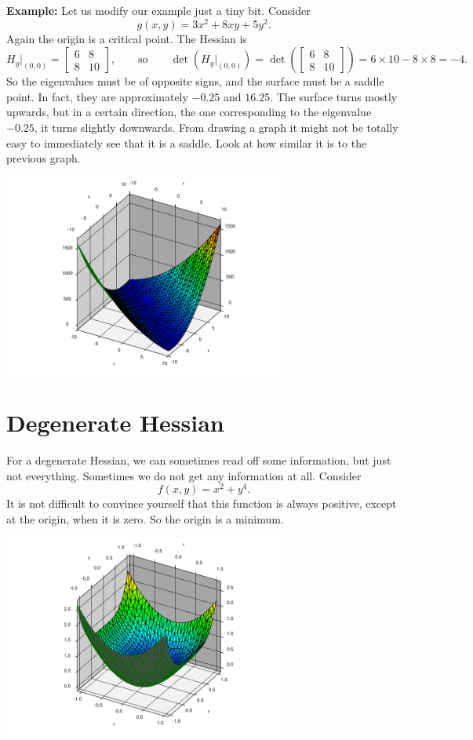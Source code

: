 \documentclass[12pt]{article}
\begin{document}
\pagebreak[2]
\textbf{Example:} Let us modify our example just a tiny bit.
Consider
\[
g(x,y) = 3 x^2 + 8xy  + 5y^2 .
\]
Again the origin is a critical point.
The Hessian is
\[
H_g\big|_{(0,0)} =
\begin{bmatrix}
6 & 8 \\
8 & 10
\end{bmatrix}
,
\qquad \text{so} \qquad
\det(H_g\big|_{(0,0)}) = 
\det \left(
\begin{bmatrix}
6 & 8 \\
8 & 10
\end{bmatrix}
\right)
=
6 \times 10 - 8 \times 8 = -4.
\]
So the eigenvalues must be of opposite signs, and the surface must be a
saddle point.  In fact, they are approximately $-0.25$ and $16.25$.
The surface turns mostly upwards, but in a certain direction, the one
corresponding to the eigenvalue $-0.25$, it turns
slightly downwards.  From drawing a graph it might not be totally easy to
immediately see that it is a saddle.  Look at how similar it is to the
previous graph.
\begin{center}
\includegraphics[width=3.65in]{mostly-upwards.pdf}
\end{center}

\bigskip

\section*{Degenerate Hessian}

For a degenerate Hessian, we can sometimes read off some information, but
just not everything.  Sometimes we do not get any information at all.
Consider
\[
f(x,y) = x^2 + y^4 .
\]
It is not difficult to convince yourself that this function is always
positive, except at the origin, when it is zero.  So the origin is a minimum.
\begin{center}
\includegraphics[width=3.65in]{degenerate-min.pdf}
\end{center}
\end{document}
